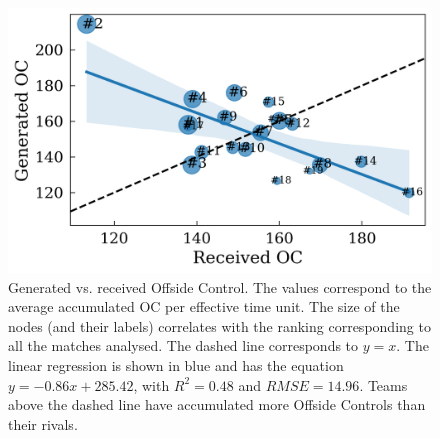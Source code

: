 \documentclass[
  10pt,
  twoside,nohyper]{book}
\begin{document}
\pagebreak

\begin{figure}[H]

{\centering \includegraphics[width=0.7\linewidth,]{imagenes/Mean_rival_OC_vs_team_norm_efftime} 

}

\caption{Generated vs. received Offside Control. The values correspond to the average accumulated OC per effective time unit. The size of the nodes (and their labels) correlates with the ranking corresponding to all the matches analysed. The dashed line corresponds to $y=x$. The linear regression is shown in blue and has the equation $y = -0.86x + 285.42$, with $R^2 = 0.48$ and $RMSE = 14.96$. Teams above the dashed line have accumulated more Offside Controls than their rivals.}\label{fig:ranking}
\end{figure}
\end{document}

